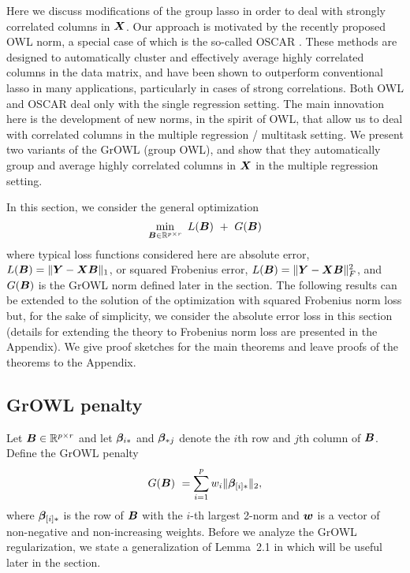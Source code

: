 
Here we discuss modifications of the group lasso in order to deal with strongly correlated columns in $\boldsymbol{X}$.  Our approach is motivated by the recently proposed OWL \cite{owl} norm, a special case of which is the so-called OSCAR \cite{oscar}.  These methods are designed to automatically cluster and effectively average highly correlated columns in the data matrix, and have been shown to outperform conventional lasso in many applications, particularly in cases of strong correlations. Both OWL and OSCAR deal only with the single regression setting. The main innovation here is the development of new norms, in the spirit of OWL, that allow us to deal with correlated columns in the multiple regression / multitask setting. We present two variants of the GrOWL (group OWL), and show that they  automatically group and average highly correlated columns in $\boldsymbol{X}$ in the multiple regression setting. 

In this section, we consider the general optimization
\begin{equation}\label{eqn:L1}
\min_{\bB \in \R^{p \times r}} \ L(\bB) \ + \ G(\bB)   
\end{equation}
 where typical loss functions considered here are absolute error, $L(\boldsymbol{B}) = \|\boldsymbol{Y} - \boldsymbol{X} \boldsymbol{B} \|_1$, or squared Frobenius error, $L(\boldsymbol{B}) = \|\boldsymbol{Y} - \boldsymbol{X} \boldsymbol{B} \|_F^2$, and $G(\boldsymbol{B})$ is the GrOWL norm defined later in the section. The following results can be extended to the solution of the optimization with squared Frobenius norm loss but, for the sake of simplicity, we consider the absolute error loss in this section (details for extending the theory to Frobenius norm loss are presented in the Appendix). We give proof sketches for the main theorems and leave proofs of the theorems to the Appendix.  

\subsection{GrOWL penalty}
Let $\boldsymbol{B} \in {\mathbb R}^{p\times r}$ and let $\boldsymbol{\beta}_{i {\ast}}$ and $\boldsymbol{\beta}_{{\ast}  j}$ denote the $i$th row and $j$th column of $\boldsymbol{B}$.  Define the GrOWL penalty
\begin{equation}\label{Eqn:growl}
G(\bB) \ =  \sum_{i=1}^p w_i \|\bbeta_{[i]\a}\|_2 , 
\end{equation}
where $\boldsymbol{\beta}_{[i]{\ast}}$ is the row of $\boldsymbol{B}$ with the $i$-th largest 2-norm and $\boldsymbol{w}$ is a vector of non-negative and non-increasing weights.
Before we analyze the GrOWL regularization, we state a generalization of Lemma~2.1 in \cite{owl} which will be useful later in the section. 

